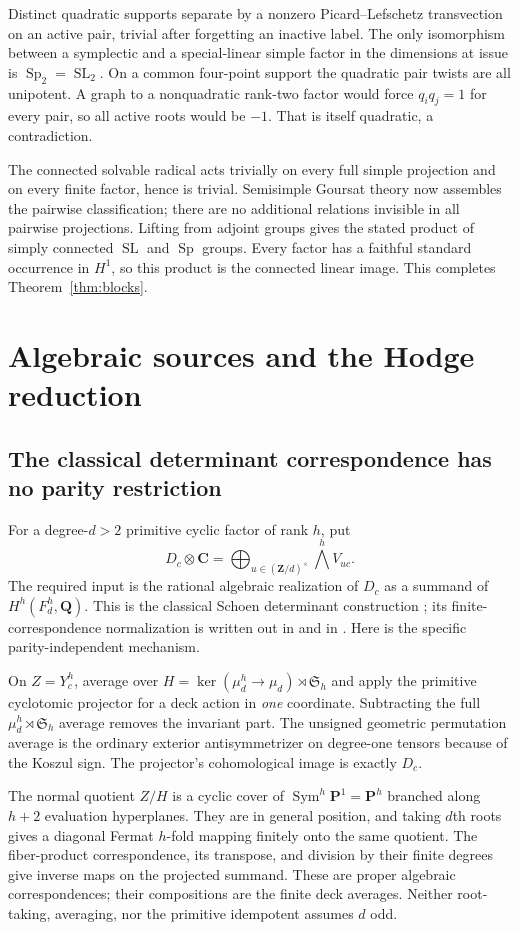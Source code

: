 \documentclass[11pt]{article}
\theoremstyle{remark}\newtheorem{remark}[theorem]{Remark}
\newcommand{\Q}{\mathbf Q}\newcommand{\C}{\mathbf C}
\newcommand{\Z}{\mathbf Z}\newcommand{\PP}{\mathbf P}
\DeclareMathOperator{\SL}{SL}\DeclareMathOperator{\Sp}{Sp}
\DeclareMathOperator{\Sym}{Sym}\DeclareMathOperator{\im}{im}
\begin{document}
Distinct quadratic supports separate by a nonzero Picard--Lefschetz
transvection on an active pair, trivial after forgetting an inactive label.
The only isomorphism between a symplectic and a special-linear simple
factor in the dimensions at issue is $\Sp_2=\SL_2$. On a common
four-point support the quadratic pair twists are all unipotent. A graph
to a nonquadratic rank-two factor would force $q_iq_j=1$ for every pair,
so all active roots would be $-1$. That is itself quadratic, a contradiction.

The connected solvable radical acts trivially on every full simple
projection and on every finite factor, hence is trivial. Semisimple
Goursat theory now assembles the pairwise classification; there are no
additional relations invisible in all pairwise projections. Lifting from
adjoint groups gives the stated product of simply connected $\SL$ and
$\Sp$ groups. Every factor has a faithful standard occurrence in $H^1$,
so this product is the connected linear image. This completes
Theorem~\ref{thm:blocks}.

\section{Algebraic sources and the Hodge reduction}
\subsection{The classical determinant correspondence has no parity restriction}
For a degree-$d>2$ primitive cyclic factor of rank $h$, put
\[
 D_c\otimes\C=\bigoplus_{u\in(\Z/d)^\times}\bigwedge^h V_{uc}.
\]
The required input is the rational algebraic realization of $D_c$ as a
summand of $H^h(F_d^h,\Q)$. This is the classical Schoen determinant
construction \cite[Lemmas 1.1--1.2]{Schoen88}; its finite-correspondence
normalization is written out in \cite[Section 7]{Structural} and in
\cite{Fermat}. Here is the specific parity-independent mechanism.

On $Z=Y_c^h$, average over
$H=\ker(\mu_d^h\to\mu_d)\rtimes\mathfrak S_h$ and apply the primitive
cyclotomic projector for a deck action in \emph{one} coordinate. Subtracting
the full $\mu_d^h\rtimes\mathfrak S_h$ average removes the invariant
part. The unsigned geometric permutation average is the ordinary exterior
antisymmetrizer on degree-one tensors because of the Koszul sign. The
projector's cohomological image is exactly $D_c$.

The normal quotient $Z/H$ is a cyclic cover of $\Sym^h\PP^1=\PP^h$
branched along $h+2$ evaluation hyperplanes. They are in general position,
and taking $d$th roots gives a diagonal Fermat $h$-fold mapping finitely
onto the same quotient. The fiber-product correspondence, its transpose,
and division by their finite degrees give inverse maps on the projected
summand. These are proper algebraic correspondences; their compositions
are the finite deck averages. Neither root-taking, averaging, nor the
primitive idempotent assumes $d$ odd.
\end{document}

